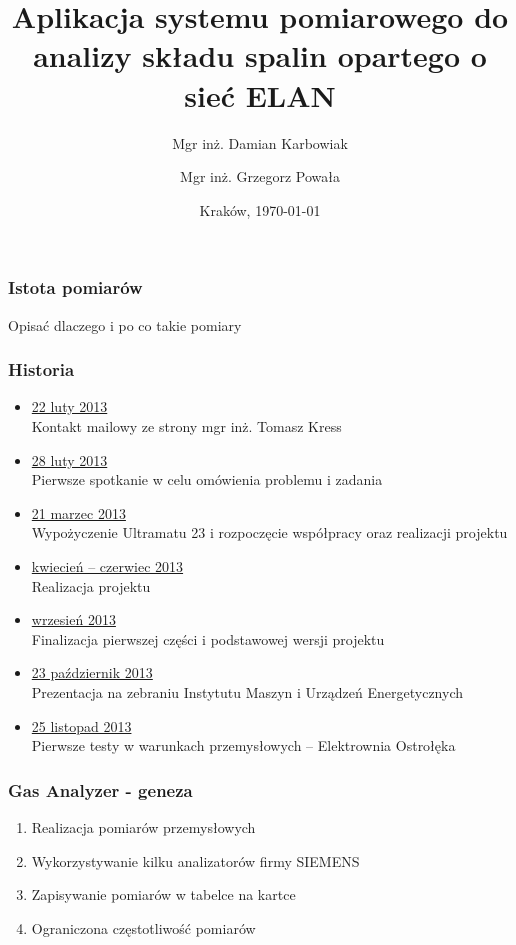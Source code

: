 \documentclass[ucs]{beamer}
\title[Gas Analyzer]{Aplikacja systemu pomiarowego do analizy składu spalin opartego o sieć ELAN}
\author[D. Karbowiak, G. Powała]{Mgr inż. Damian Karbowiak  \and Mgr inż. Grzegorz Powała}
\institute[Politechnika Śl.]{\large Politechnika Śląska \\\vspace{0.75cm} \texttt{[image: images/PolslLogo]} }
\date{Kraków, \today}
\begin{document}
\begin{frame}
  \titlepage
\end{frame}

\begin{frame}
\frametitle{Istota pomiarów}
Opisać dlaczego i po co takie pomiary
\end{frame}

\begin{frame}
\frametitle{Historia}
\vspace{-2mm}
\begin{itemize}
\setlength{\itemsep}{0pt}
\setlength{\parskip}{0pt}
\setlength{\parsep}{0pt}
\item \underline{22 luty 2013} \\
Kontakt mailowy ze strony mgr inż. Tomasz Kress
\item \underline{28 luty 2013} \\
Pierwsze spotkanie w celu omówienia problemu i zadania
\item \underline{21 marzec 2013} \\
Wypożyczenie Ultramatu 23 i rozpoczęcie współpracy oraz realizacji projektu
\item \underline{kwiecień -- czerwiec 2013} \\
Realizacja projektu
\item \underline{wrzesień 2013} \\
Finalizacja pierwszej części i podstawowej wersji projektu
\item \underline{23 październik 2013} \\
Prezentacja na zebraniu Instytutu Maszyn i Urządzeń Energetycznych
\item \underline{25 listopad 2013} \\
Pierwsze testy w warunkach przemysłowych -- Elektrownia Ostrołęka
\end{itemize}
\end{frame}

\begin{frame}
\frametitle{Gas Analyzer - geneza}
\begin{enumerate}
\setlength{\itemsep}{5pt}
\setlength{\parskip}{5pt}
\setlength{\parsep}{5pt}
\item Realizacja pomiarów przemysłowych
\item Wykorzystywanie kilku analizatorów firmy SIEMENS
\item Zapisywanie pomiarów w tabelce na kartce
\item Ograniczona częstotliwość pomiarów
\end{enumerate}
\end{frame}
\end{document}
